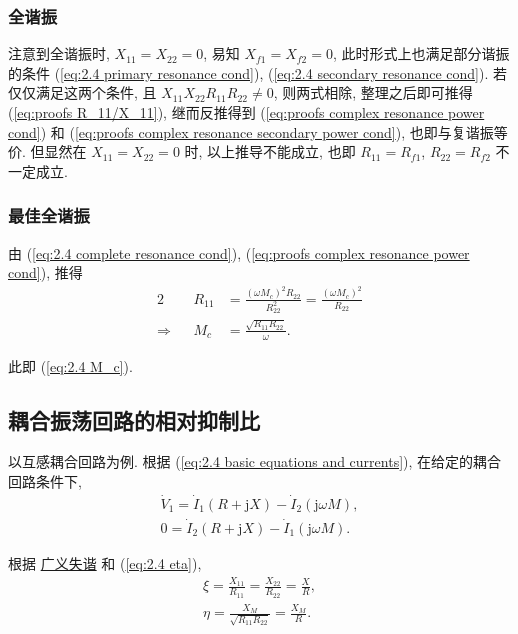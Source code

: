 \subsubsection{全谐振}

注意到全谐振时, $X_{11}=X_{22}=0$, 易知 $X_{f1}=X_{f2}=0$, 此时形式上也满足部分谐振的条件 (\ref{eq:2.4 primary resonance cond}), (\ref{eq:2.4 secondary resonance cond}). 若仅仅满足这两个条件, 且 $X_{11}X_{22}R_{11}R_{22}\neq 0$, 则两式相除, 整理之后即可推得 (\ref{eq:proofs R_11/X_11}), 继而反推得到 (\ref{eq:proofs complex resonance power cond}) 和 (\ref{eq:proofs complex resonance secondary power cond}), 也即与复谐振等价. 但显然在 $X_{11}=X_{22}=0$ 时, 以上推导不能成立, 也即 $R_{11}=R_{f1}$, $R_{22}=R_{f2}$ 不一定成立.

\subsubsection{最佳全谐振}

由 (\ref{eq:2.4 complete resonance cond}), (\ref{eq:proofs complex resonance power cond}), 推得
\begin{alignat*}{2}
                &  & R_{11} & =\frac{(\omega M_c)^2R_{22}}{R_{22}^2}=\frac{(\omega M_c)^2}{R_{22}} \\
    \Rightarrow &  & M_c    & =\frac{\sqrt{R_{11}R_{22}}}{\omega}.
\end{alignat*}

\noindent 此即 (\ref{eq:2.4 M_c}).

\subsection{耦合振荡回路的相对抑制比}

以互感耦合回路为例. 根据 (\ref{eq:2.4 basic equations and currents}), 在给定的耦合回路条件下,
\begin{gather} \label{eq:proofs basic equations}
    \dot{V}_1=\dot{I}_1(R+\mathrm{j}X)-\dot{I}_2(\mathrm{j}\omega M), \\
    0=\dot{I}_2(R+\mathrm{j}X)-\dot{I}_1(\mathrm{j}\omega M).
\end{gather}

根据 \hyperref[eq:2.1 xi]{广义失谐} 和 (\ref{eq:2.4 eta}),
\begin{gather}
    \xi=\frac{X_{11}}{R_{11}}=\frac{X_{22}}{R_{22}}=\frac{X}{R}, \label{eq:proofs coupled circuit xi} \\
    \eta=\frac{X_M}{\sqrt{R_{11}R_{22}}}=\frac{X_M}{R}. \label{eq:proofs coupled circuit eta}
\end{gather}

